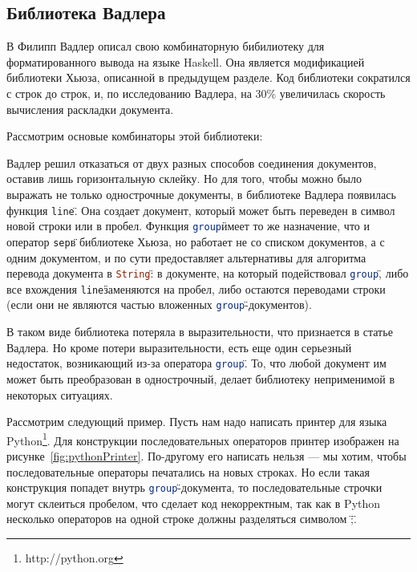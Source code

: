 \newpage

\subsection{Библиотека Вадлера}

В \cite{wadler} Филипп Вадлер описал свою комбинаторную бибилиотеку для форматированного вывода на языке Haskell. Она является модификацией библиотеки Хьюза, описанной в предыдущем разделе. Код библиотеки сократился с  строк до  строк, и, по исследованию Вадлера, на 30\% увеличилась скорость вычисления раскладки документа.

Рассмотрим основые комбинаторы этой библиотеки:


Вадлер решил отказаться от двух разных способов соединения документов, оставив лишь горизонтальную склейку. Но для того, чтобы можно было выражать не только однострочные документы, в библиотеке Вадлера появилась функция \"\lstinline[language=Haskell]{line}\". Она создает документ, который может быть переведен в символ новой строки или в пробел.
Функция \"\lstinline[language=Haskell]{group}\" имеет то же назначение, что и оператор \"\lstinline[language=Haskell]{sep}\" в библиотеке Хьюза, но работает не со списком документов, а с одним документом, и по сути предоставляет альтернативы для алгоритма перевода документа в \"\lstinline[language=Haskell]{String}\": в документе, на который подействовал \"\lstinline[language=Haskell]{group}\", либо все вхождения \"\lstinline[language=Haskell]{line}\" заменяются на пробел, либо остаются переводами строки (если они не являются частью вложенных \"\lstinline[language=Haskell]{group}\"-документов).

В таком виде библиотека потеряла в выразительности, что признается в статье Вадлера. Но кроме потери выразительности, есть еще один серьезный недостаток, возникающий из-за оператора \"\lstinline[language=Haskell]{group}\". То, что любой документ им может быть преобразован в однострочный, делает библиотеку неприменимой в некоторых ситуациях. 

Рассмотрим следующий пример. Пусть нам надо написать принтер для языка Python\footnote{http://python.org}. Для конструкции последовательных операторов принтер изображен на рисунке~\ref{fig:pythonPrinter}.
По-другому его написать нельзя --- мы хотим, чтобы последовательные операторы печатались на новых строках. Но если такая конструкция попадет внутрь \"\lstinline[language=Haskell]{group}\"-документа, то последовательные строчки могут склеиться пробелом, что сделает код некорректным, так как в Python несколько операторов на одной строке должны разделяться символом \";\".

